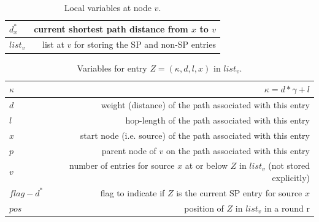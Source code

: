 \documentclass[11pt]{article}  %
\begin{document}
\begin{table}[h!]
  \begin{center}
    \caption{Local variables at node $v$.}
    \begin{tabular}{l|r} %
      \hline
      $d^{*}_{x}$ & current shortest path distance from $x$ to $v$\\
      \hline
      $list_v$ & list at $v$ for storing the SP and non-SP entries\\
    \end{tabular}
  \end{center}
\end{table}

\begin{table}[h!]
  \begin{center}
    \caption{Variables for entry $Z=(\kappa,d,l,x)$ in $list_v$.}
    \begin{tabular}{l|r} %
      \hline
      $\kappa$ & $\kappa = d*\gamma + l$\\
      \hline
      $d$ & weight (distance) of the path associated with this entry\\
      \hline
      $l$ & hop-length of the path associated with this entry\\
      \hline
      $x$ & start node (i.e. source) of the path associated with this entry\\
      \hline
      $p$ & parent node of $v$ on the path associated with this entry\\
      \hline
      $v$ & number of entries for source $x$ at or below $Z$ in $list_v$ (not stored explicitly)\\
      \hline
      $flag-d^*$ & flag to indicate if $Z$ is the current SP entry for source $x$\\
      \hline
      $pos$ & position of $Z$ in $list_v$ in a round r
    \end{tabular}
  \end{center}
\end{table}
\end{document}
